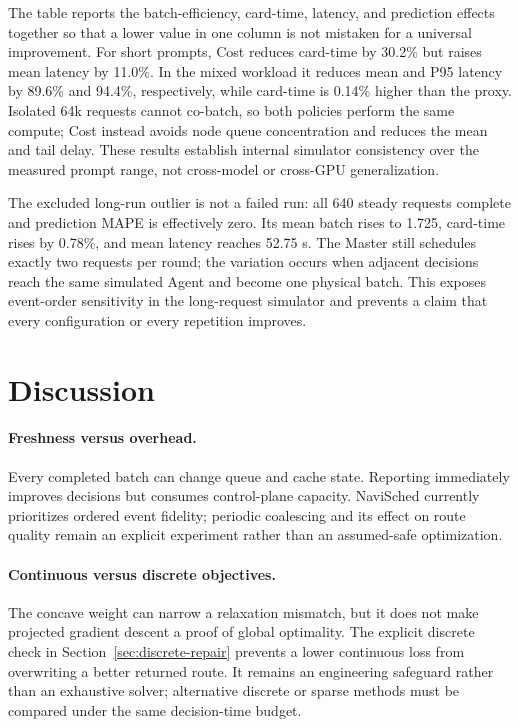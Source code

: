 \documentclass[10pt]{article}
\newcommand{\system}{NaviSched\xspace}
\begin{document}
\FloatBarrier
The table reports the batch-efficiency, card-time, latency, and prediction
effects together so that a lower value in one column is not mistaken for a
universal improvement. For short prompts, Cost reduces card-time by 30.2\%
but raises mean latency by 11.0\%. In the mixed workload it reduces mean and
P95 latency by 89.6\% and 94.4\%, respectively, while card-time is 0.14\%
higher than the proxy. Isolated 64k requests cannot co-batch, so both policies
perform the same compute; Cost instead avoids node queue concentration and
reduces the mean and tail delay. These results establish internal simulator
consistency over the measured prompt range, not cross-model or cross-GPU
generalization.

The excluded long-run outlier is not a failed run: all 640 steady requests
complete and prediction MAPE is effectively zero. Its mean batch rises to
1.725, card-time rises by 0.78\%, and mean latency reaches 52.75 s. The Master
still schedules exactly two requests per round; the variation occurs when
adjacent decisions reach the same simulated Agent and become one physical
batch. This exposes event-order sensitivity in the long-request simulator and
prevents a claim that every configuration or every repetition improves.

\FloatBarrier
\section{Discussion}

\paragraph{Freshness versus overhead.}
Every completed batch can change queue and cache state. Reporting immediately
improves decisions but consumes control-plane capacity. \system currently
prioritizes ordered event fidelity; periodic coalescing and its effect on
route quality remain an explicit experiment rather than an assumed-safe
optimization.

\paragraph{Continuous versus discrete objectives.}
The concave weight can narrow a relaxation mismatch, but it does not make
projected gradient descent a proof of global optimality. The explicit
discrete check in Section~\ref{sec:discrete-repair} prevents a lower
continuous loss from overwriting a better returned route. It remains an
engineering safeguard rather than an exhaustive solver; alternative discrete
or sparse methods must be compared under the same decision-time budget.
\end{document}
